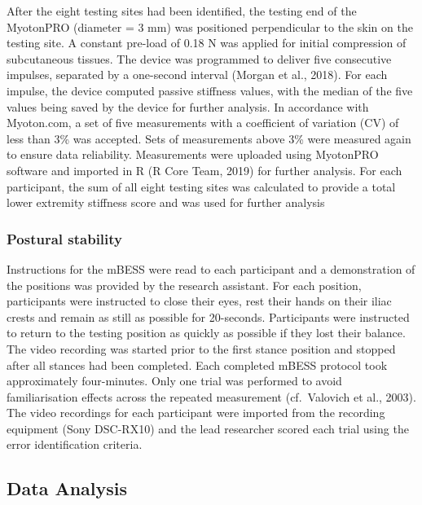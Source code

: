 \documentclass[
  english,
  man,floatsintext]{apa6}
\begin{document}
After the eight testing sites had been identified, the testing end of the MyotonPRO (diameter = 3 mm) was positioned perpendicular to the skin on the testing site.
A constant pre-load of 0.18 N was applied for initial compression of subcutaneous tissues.
The device was programmed to deliver five consecutive impulses, separated by a one-second interval (Morgan et al., 2018).
For each impulse, the device computed passive stiffness values, with the median of the five values being saved by the device for further analysis. In accordance with Myoton.com, a set of five measurements with a coefficient of variation (CV) of less than 3\% was accepted. Sets of measurements above 3\% were measured again to ensure data reliability.
Measurements were uploaded using MyotonPRO software and imported in R (R Core Team, 2019) for further analysis. For each participant, the sum of all eight testing sites was calculated to provide a total lower extremity stiffness score and was used for further analysis

\hypertarget{postural-stability-1}{%
\subsubsection{Postural stability}\label{postural-stability-1}}

Instructions for the mBESS were read to each participant and a demonstration of the positions was provided by the research assistant.
For each position, participants were instructed to close their eyes, rest their hands on their iliac crests and remain as still as possible for 20-seconds.
Participants were instructed to return to the testing position as quickly as possible if they lost their balance.
The video recording was started prior to the first stance position and stopped after all stances had been completed.
Each completed mBESS protocol took approximately four-minutes.
Only one trial was performed to avoid familiarisation effects across the repeated measurement (cf.~Valovich et al., 2003).
The video recordings for each participant were imported from the recording equipment (Sony DSC-RX10) and the lead researcher scored each trial using the error identification criteria.

\hypertarget{data-analysis}{%
\subsection{Data Analysis}\label{data-analysis}}
\end{document}
